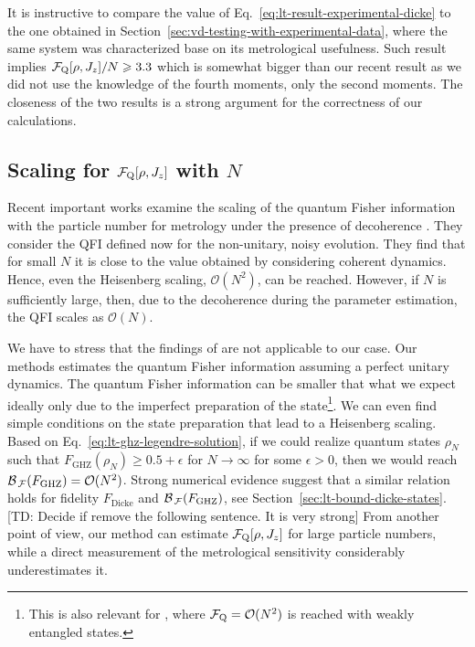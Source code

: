 It is instructive to compare the value of Eq.~\eqref{eq:lt-result-experimental-dicke} to the one obtained in Section~\ref{sec:vd-testing-with-experimental-data}, where the same system was characterized base on its metrological usefulness.
Such result implies $\mathcal{F}_{\textnormal{Q}}[{\textstyle \rho,J_z}]/N\geqslant3.3$ which is somewhat bigger than our recent result as we did not use the knowledge of the fourth moments, only the second moments.
The closeness of the two results is a strong argument for the correctness of our calculations.

\subsection{Scaling for $\mathcal{F}_{\textnormal{Q}}[{\textstyle \rho,J_z}]$ with $N$}

Recent important works examine the scaling of the quantum Fisher information with the particle number for metrology under the presence of decoherence \cite{Escher2011, Demkowicz-Dobrzanski2012}.
They consider the QFI defined now for the non-unitary, noisy evolution.
They find that for small $N$ it is close to the value obtained by considering coherent dynamics.
Hence, even the Heisenberg scaling, $\mathcal{O}(N^2)$, can be reached.
However, if $N$ is sufficiently large, then, due to the decoherence during the parameter estimation, the QFI scales as $\mathcal{O}(N)$.

We have to stress that the findings of \cite{Escher2011, Demkowicz-Dobrzanski2012} are not applicable to our case.
Our methods estimates the quantum Fisher information assuming a perfect unitary dynamics.
The quantum Fisher information can be smaller that what we expect ideally only due to the imperfect preparation of the state\footnote{
This is also relevant for \cite{Augusiak2015}, where $\mathcal{F}_{\textnormal{Q}}=\mathcal{O}(N^2)$ is reached with weakly entangled states.}.
We can even find simple conditions on the state preparation that lead to a Heisenberg scaling.
Based on Eq.~\eqref{eq:lt-ghz-legendre-solution}, if we could realize quantum states $\rho_N$ such that $F_{\text{GHZ}}(\rho_N)\geqslant0.5+\epsilon$ for $N\rightarrow\infty$ for some $\epsilon>0$, then we would reach $\mathcal{B}_{\, \mathcal{F} }(F_{\text{GHZ}}) = \mathcal{O}(N^2)$.
Strong numerical evidence suggest that a similar relation holds for fidelity $F_{\text{Dicke}}$ and $\mathcal{B}_{\, \mathcal{F} }(F_{\text{GHZ}})$, see Section~\ref{sec:lt-bound-dicke-states}.
[TD: Decide if remove the following sentence. It is very strong]
From another point of view, our method can estimate $\mathcal{F}_{\textnormal{Q}}[{\textstyle \rho,J_z}]$ for large particle numbers, while a direct measurement of the metrological sensitivity considerably underestimates it.
